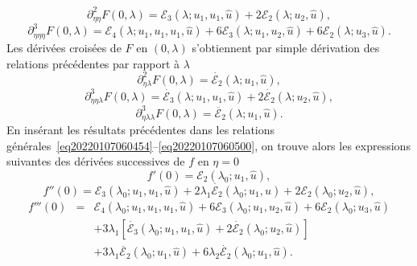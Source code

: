\documentclass[12pt, final]{amsart}
\begin{document}
\begin{equation}
  \partial_{\eta  \eta}^2 F (0, \lambda) =\mathcal{E}_3 (\lambda ;
  u_1, u_1, \hat{u}) + 2\mathcal{E}_2 (\lambda ; u_2, \hat{u}),
\end{equation}
\begin{equation}
  \partial_{\eta  \eta  \eta}^3 F (0, \lambda) =\mathcal{E}_4
  (\lambda ; u_1, u_1, u_1, \hat{u}) + 6\mathcal{E}_3 (\lambda ; u_1, u_2,
  \hat{u}) + 6\mathcal{E}_2 (\lambda ; u_3, \hat{u}) .
\end{equation}
Les dérivées croisées de $F$ en $(0, \lambda)$ s'obtiennent par
simple dérivation des relations précédentes par rapport {\`a}
$\lambda$
\begin{equation}
  \partial_{\eta  \lambda}^2 F (0, \lambda) = \dot{\mathcal{E}_2}
  (\lambda ; u_1, \hat{u}),
\end{equation}
\begin{equation}
  \partial_{\eta  \eta  \lambda}^3 F (0, \lambda) =
  \dot{\mathcal{E}_3} (\lambda ; u_1, u_1, \hat{u}) + 2 \dot{\mathcal{E}_2}
  (\lambda ; u_2, \hat{u}),
\end{equation}
\begin{equation}
  \partial_{\eta  \lambda  \lambda}^3 F (0, \lambda) =
  \ddot{\mathcal{E}_2} (\lambda ; u_1, \hat{u}) .
\end{equation}
En insérant les résultats précédentes dans les relations
générales~\eqref{eq20220107060454}--\eqref{eq20220107060500}, on
trouve alors les expressions suivantes des dérivées successives de $f$
en $\eta = 0$
\begin{equation}
  f' (0) =\mathcal{E}_2 (\lambda_0 ; u_1, \hat{u}),
\end{equation}
\begin{equation}
  f'' (0) =\mathcal{E}_3 (\lambda_0 ; u_1, u_1, \hat{u}) + 2 \lambda_1
  \dot{\mathcal{E}_2} (\lambda_0 ; u_1, \hat{u}) + 2\mathcal{E}_2 (\lambda_0 ;
  u_2, \hat{u}),
\end{equation}
\begin{eqnarray}
  f''' (0) & = & \mathcal{E}_4 (\lambda_0 ; u_1, u_1, u_1, \hat{u}) +
  6\mathcal{E}_3 (\lambda_0 ; u_1, u_2, \hat{u}) + 6\mathcal{E}_2 (\lambda_0 ;
  u_3, \hat{u}) \nonumber\\
  &  &  + 3 \lambda_1  [\dot{\mathcal{E}_3} (\lambda_0 ; u_1, u_1,
  \hat{u}) + 2 \dot{\mathcal{E}_2} (\lambda_0 ; u_2, \hat{u})] \nonumber\\
  &  &  + 3 \lambda_1   \ddot{\mathcal{E}_2} (\lambda_0 ; u_1,
  \hat{u}) + 6 \lambda_2  \dot{\mathcal{E}_2} (\lambda_0 ; u_1, \hat{u}) .
\end{eqnarray}
\end{document}

